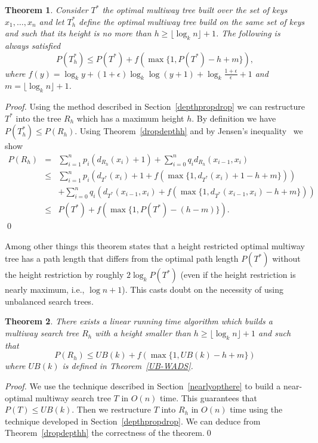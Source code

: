 \documentclass{llncs}\usepackage[english]{babel}
\newtheorem{thm}{Theorem}
\begin{document}
\begin{thm}
Consider $T^*$ the optimal multiway tree built over the set of keys $x_1, \ldots,x_n$ and let $T^*_h$ define the optimal multiway tree build on the same set of keys and such that its height is no more than $h\geq \lfloor \log_{k} n \rfloor+1$. The following is always satisfied
\vspace{-0.1cm}
$$
P(T^*_h)\leq P(T^*)+f(\max\{1,P(T^*)-h+m\}),
$$
where $f(y)=\log_k y + (1+\epsilon)\log_k \log (y+1) + \log_k \frac{1+\epsilon}{\epsilon}+1$ and $m=\lfloor \log_{k}  n \rfloor+1$.
\end{thm}
\begin{proof}
Using the method described in Section~\ref{depthpropdrop} we can restructure $T^*$ into the tree $R_h$ which has a maximum height $h$. By definition we have $P(T^*_h)\leq P(R_h)$. Using Theorem~\ref{dropdepthh} and by Jensen's inequality~\cite{Jensen} we show
\vspace{-0.2cm}
\begin{eqnarray*}
P(R_h)&=&\sum_{i=1}^n p_i (d_{R_h}(x_i)+1) + \sum_{i=0}^n q_i d_{R_h}(x_{i-1},x_{i})\\
&\leq&\sum_{i=1}^n p_i (d_{T^*}(x_i)+1+f(\max\{1,d_{T^*}(x_i)+1-h+m\})) \\
& & + \sum_{i=0}^n q_i (d_{T^*}(x_{i-1},x_i)+f(\max\{1,d_{T^*}(x_{i-1},x_i)-h+m\}))\\
&\leq&P(T^*)+f(\max\{1,P(T^*)-(h-m)\}).
\end{eqnarray*}
\qed 
\vspace{-0.2cm}
\end{proof}

Among other things this theorem states that a height restricted optimal multiway tree has a path length that differs from the optimal path length $P(T^*)$ without the height restriction by roughly $2
\log_k P(T^*)$ (even if the height restriction is nearly maximum, i.e., $\log n +1$). This casts doubt on the necessity of using unbalanced search trees.

\begin{thm}
There exists a linear running time algorithm which builds a multiway search tree $R_h$ with a height smaller than $h\geq \lfloor \log_{k} n \rfloor+1$ and such that  
$$
P(R_h)\leq  UB(k) + f(\max\{1,UB(k)-h+m\})
$$ 
where $UB(k)$ is defined in Theorem~\ref{UB-WADS}.
\end{thm}
\begin{proof}
We use the technique described in Section~\ref{nearlyopthere} to build a near-optimal multiway search tree $T$ in $O(n)$ time. This guarantees that $P(T)\leq UB(k)$. Then we restructure $T$ into $R_h$ in $O(n)$ time using the technique developed in Section~\ref{depthpropdrop}. We can deduce from Theorem~\ref{dropdepthh} the correctness of the theorem.\qed \end{proof}
\end{document}
